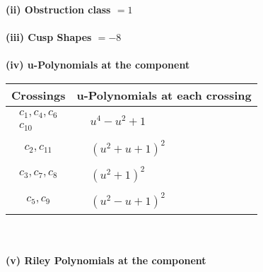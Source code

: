 \documentclass[1p]{elsarticle_modified}
\theoremstyle{definition}
\begin{document}
\flushleft \textbf{(ii) Obstruction class $= 1$}\\~\\
\flushleft \textbf{(iii) Cusp Shapes $= -8$}\\~\\
\newpage\renewcommand{\arraystretch}{1}
\flushleft \textbf{(iv) u-Polynomials at the component}\newline \\
\begin{tabular}{m{50pt}|m{274pt}}
Crossings & \hspace{64pt}u-Polynomials at each crossing \\
\hline $$\begin{aligned}c_{1},c_{4},c_{6}\\c_{10}\end{aligned}$$&$\begin{aligned}
&u^4- u^2+1
\end{aligned}$\\
\hline $$\begin{aligned}c_{2},c_{11}\end{aligned}$$&$\begin{aligned}
&(u^2+u+1)^2
\end{aligned}$\\
\hline $$\begin{aligned}c_{3},c_{7},c_{8}\end{aligned}$$&$\begin{aligned}
&(u^2+1)^2
\end{aligned}$\\
\hline $$\begin{aligned}c_{5},c_{9}\end{aligned}$$&$\begin{aligned}
&(u^2- u+1)^2
\end{aligned}$\\
\hline
\end{tabular}\\~\\
\newpage\renewcommand{\arraystretch}{1}
\flushleft \textbf{(v) Riley Polynomials at the component}\newline \\
\end{document}
